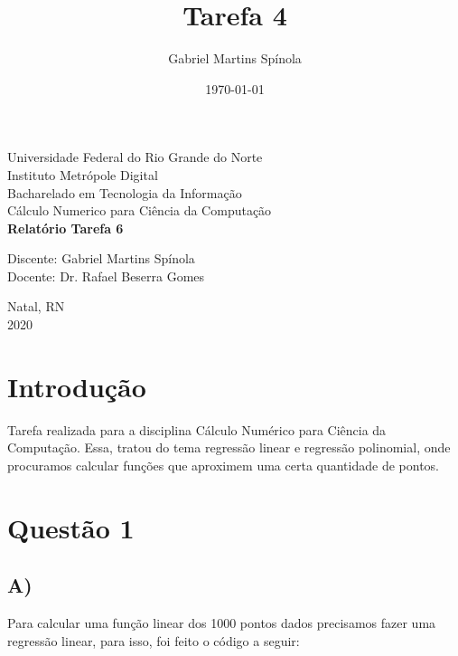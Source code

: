 \documentclass{article}
\title{Tarefa 4}
\author{Gabriel Martins Spínola}
\date{\today}
\begin{document}
\begin{titlepage} %
\begin{center} %
{\large Universidade Federal do Rio Grande do Norte}\\[0.2cm] %
{\large Instituto Metrópole Digital}\\[0.2cm] %
{\large Bacharelado em Tecnologia da Informação}\\[0.2cm]
{\large Cálculo Numerico para Ciência da Computação}\\[5.0cm]
{\bf \huge Relatório Tarefa 6}\\[5.0cm] %
\end{center} %
{\large Discente: Gabriel Martins Spínola}\\[0.7cm] %
{\large Docente: Dr. Rafael Beserra Gomes}\\[3.2cm]
\begin{center}
{\large Natal, RN}\\[0.2cm]
{\large 2020}
\end{center}
\end{titlepage} %


\section*{Introdução}
\hspace{0.5cm}Tarefa realizada para a disciplina Cálculo Numérico para Ciência da Computação. Essa, tratou do tema regressão linear e regressão polinomial, onde procuramos calcular funções que aproximem uma certa quantidade de pontos.

\section*{Questão 1}
    \subsection*{A)}\hspace{0.5cm}Para calcular uma função linear dos 1000 pontos dados precisamos fazer uma regressão linear, para isso, foi feito o código a seguir:
    \inputminted[]{python}{questao1.py}
    
\end{document}
